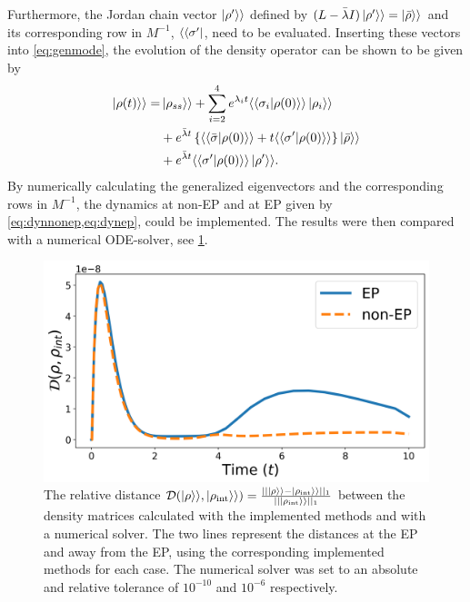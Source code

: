 \documentclass[../main.tex]{subfiles}
\begin{document}
Furthermore, the Jordan chain vector $\ket{\rho'}\rangle$ defined by $(L - \bar\lambda I)\ket{\rho'}\rangle = \ket{\bar\rho}\rangle$ and its corresponding row in $M^{-1}$, $\langle\bra{\sigma'}$, need to be evaluated. Inserting these vectors into \cref{eq:genmode}, the evolution of the density operator can be shown to be given by
\begin{equation}\label{eq:dynep}
    \begin{aligned}
        \ket{\rho(t)}\rangle = &\ket{\rho_{ss}}\rangle + \sum_{i=2}^4 e^{\lambda_i t} \langle\braket{\sigma_i|\rho(0)}\rangle \ket{\rho_i}\rangle \\ 
                               & + e^{\bar \lambda t}\left\{\langle\braket{\bar\sigma|\rho(0)}\rangle + t\langle\braket{\sigma'|\rho(0)}\rangle \right\}\ket{\bar \rho}\rangle \\ 
                               & + e^{\bar\lambda t} \langle\braket{\sigma'|\rho(0)}\rangle\ket{\rho'}\rangle.
    \end{aligned}
\end{equation}
By numerically calculating the generalized eigenvectors and the corresponding rows in $M^{-1}$, the dynamics at non-EP and at EP given by \cref{eq:dynnonep,eq:dynep}, could be implemented. The results were then compared with a numerical ODE-solver, see \cref{fig:minevsint}.

\begin{figure}[H]
    \centering
    \includegraphics[width=0.7\linewidth]{figures/minevsint.png}
    \caption{The relative distance $\mathcal{D}(\ket{\rho}\rangle, \ket{\rho_\text{int}}\rangle) = \frac{||\ket{\rho}\rangle - \ket{\rho_\text{int}}\rangle||_1}{||\ket{\rho_\text{int}}\rangle||_1}$ between the density matrices calculated with the implemented methods and with a numerical solver. The two lines represent the distances at the EP and away from the EP, using the corresponding implemented methods for each case. The numerical solver was set to an absolute and relative tolerance of $10^{-10}$ and $10^{-6}$ respectively.}
    \label{fig:minevsint}
\end{figure}
\end{document}
